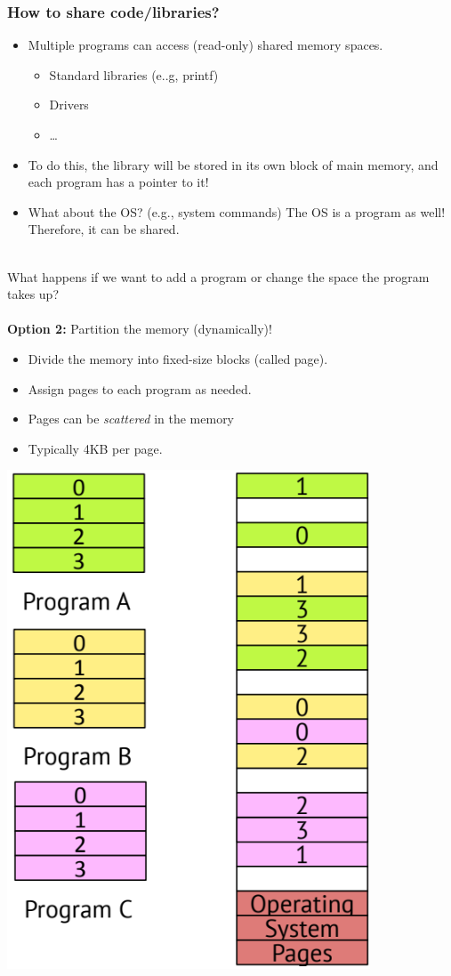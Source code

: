 \documentclass[10pt]{article}
\begin{document}
\subsubsection*{How to share code/libraries?}
\begin{itemize}
    \item Multiple programs can access (read-only) shared memory spaces.
    \begin{itemize}
        \item Standard libraries (e..g, printf)
        \item Drivers
        \item \dots
    \end{itemize}
    \item To do this, the library will be stored in its own block of main memory, and each program has a pointer to it!
    \item What about the OS?  (e.g., system commands)  The OS is a program as well!  Therefore, it can be shared.
\end{itemize}
\hrulefill
~\\
What happens if we want to add a program or change the space the program takes up?\\\\
\textbf{Option 2:} Partition the memory (dynamically)!
\begin{itemize}
    \item Divide the memory into fixed-size blocks (called page).
    \item Assign pages to each program as needed.
    \item Pages can be \textit{scattered} in the memory
    \item Typically 4KB per page.
\end{itemize}
\begin{center}
    \includegraphics*[scale=0.8]{W7_9.png}
\end{center}
\end{document}
